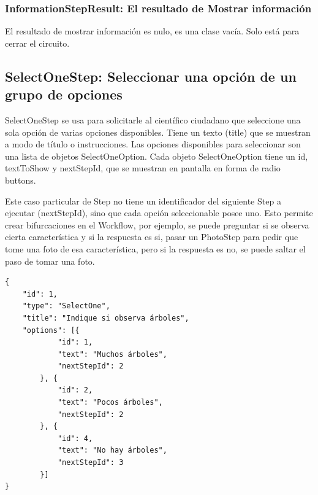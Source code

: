 \subsubsection{InformationStepResult: El resultado de Mostrar información}
El resultado de mostrar información es nulo, es una clase vacía. Solo está para cerrar el circuito.





\subsection{SelectOneStep: Seleccionar una opción de un grupo de opciones}
SelectOneStep  se usa para solicitarle al científico ciudadano que seleccione una sola opción de varias opciones disponibles. Tiene un texto (title) que se muestran a modo de título o instrucciones. Las opciones disponibles para seleccionar son una lista de objetos SelectOneOption.
Cada objeto SelectOneOption tiene un id, textToShow y nextStepId, que se muestran en pantalla en forma de radio buttons.

Este caso particular de Step no tiene un identificador del siguiente Step a ejecutar (nextStepId), sino que cada opción seleccionable posee uno. Esto permite crear bifurcaciones en el Workflow, por ejemplo, se puede preguntar si se observa cierta característica y si la respuesta es si, pasar un PhotoStep para pedir que tome una foto de esa característica, pero si la respuesta es no, se puede saltar el paso de tomar una foto.

\begin{lstlisting}[language=XML, frame=tlbr, caption=SelectOneStep usando el generador de clases.]	
{
	"id": 1,
	"type": "SelectOne",
	"title": "Indique si observa árboles",
	"options": [{
			"id": 1,
			"text": "Muchos árboles",
			"nextStepId": 2
		}, {
			"id": 2,
			"text": "Pocos árboles",
			"nextStepId": 2
		}, {
			"id": 4,
			"text": "No hay árboles",
			"nextStepId": 3
		}]
}
\end{lstlisting}

